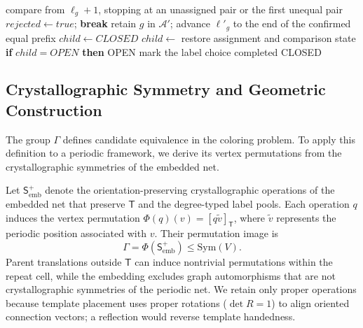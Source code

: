 \documentclass[a5paper, 10pt]{article}
\begin{document}
\begin{algorithm}[H]
\begin{algorithmic}[1]
      \State compare from $\ell_g+1$, stopping at an unassigned pair or the first unequal pair
        \State $rejected\gets true$; \textbf{break}
        \State retain $g$ in $\mathcal A'$; advance $\ell'_g$ to the end of the confirmed equal prefix
      \EndIf
    \EndFor
    \State $child\gets CLOSED$
      \State $child\gets$ 
    \EndIf
    \State restore assignment and comparison state
    \State \textbf{if} $child=OPEN$ \textbf{then} \Return OPEN
    \State mark the label choice completed
  \EndFor
  \State \Return CLOSED
\EndFunction
\end{algorithmic}
\end{algorithm}

\subsection{Crystallographic Symmetry and Geometric Construction}



\label{sec:reconstruction_method}
The group $\Gamma$ defines candidate equivalence in the coloring problem. To apply this definition to a periodic framework, we derive its vertex permutations from the crystallographic symmetries of the embedded net.

Let $\mathsf{S}_{\mathrm{emb}}^{+}$ denote the orientation-preserving crystallographic operations of the embedded net that preserve $\mathsf{T}$ and the degree-typed label pools. Each operation $q$ induces the vertex permutation $\Phi(q)(v)=[q\widetilde v]_{\mathsf T}$, where $\widetilde v$ represents the periodic position associated with $v$. Their permutation image is
\begin{equation}
\Gamma=\Phi(\mathsf{S}_{\mathrm{emb}}^{+})\leq\mathrm{Sym}(V).
\label{eq:rotation_group}
\end{equation}
Parent translations outside $\mathsf{T}$ can induce nontrivial permutations within the repeat cell, while the embedding excludes graph automorphisms that are not crystallographic symmetries of the periodic net.
We retain only proper operations because template placement uses proper rotations ($\det R=1$) to align oriented connection vectors; a reflection would reverse template handedness.
\end{document}

